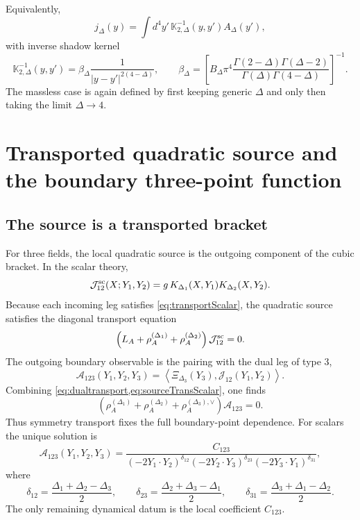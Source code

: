 \documentclass[11pt]{article}
\newcommand{\Dims}[1]{\Delta_{#1}}
\newcommand{\Ypt}[1]{Y_{#1}}
\begin{document}
Equivalently,
\begin{equation}
j_\Delta(y)
=
\int d^4y'\,\mathbb{K}_{2,\Delta}^{-1}(y,y')A_\Delta(y'),
\label{eq:amputpos}
\end{equation}
with inverse shadow kernel
\begin{equation}
\mathbb{K}_{2,\Delta}^{-1}(y,y')
=
\beta_\Delta\frac{1}{|y-y'|^{2(4-\Delta)}},
\qquad
\beta_\Delta
=
\left[
B_\Delta \pi^4
\frac{\Gamma(2-\Delta)\Gamma(\Delta-2)}
{\Gamma(\Delta)\Gamma(4-\Delta)}
\right]^{-1}.
\label{eq:shadowinv}
\end{equation}
The massless case is again defined by first keeping generic $\Delta$ and only then taking the limit $\Delta\to 4$.

\section{Transported quadratic source and the boundary three-point function}

\subsection{The source is a transported bracket}

For three fields, the local quadratic source is the outgoing component of the cubic bracket. In the scalar theory,
\begin{equation}
\mathcal{J}^{\rm sc}_{12}(X;Y_1,Y_2)
=
g\,K_{\Dims1}(X,Y_1)K_{\Dims2}(X,Y_2).
\label{eq:sourceScalar}
\end{equation}
Because each incoming leg satisfies \cref{eq:transportScalar}, the quadratic source satisfies the diagonal transport equation
\begin{equation}
\left(
L_A+\rho_A^{(\Dims1)}+\rho_A^{(\Dims2)}
\right)\mathcal{J}^{\rm sc}_{12}=0.
\label{eq:sourceTransScalar}
\end{equation}
The outgoing boundary observable is the pairing with the dual leg of type $3$,
\begin{equation}
\mathcal{A}_{123}(Y_1,Y_2,Y_3)
=
\left\langle
\Xi_{\Dims3}(Y_3),\mathcal{J}_{12}(Y_1,Y_2)
\right\rangle.
\label{eq:A123def}
\end{equation}
Combining \cref{eq:dualtransport,eq:sourceTransScalar}, one finds
\begin{equation}
\left(
\rho_A^{(\Dims1)}+\rho_A^{(\Dims2)}+\rho_A^{(\Dims3),\vee}
\right)\mathcal{A}_{123}=0.
\label{eq:A123inv}
\end{equation}
Thus symmetry transport fixes the full boundary-point dependence. For scalars the unique solution is
\begin{equation}
\mathcal{A}_{123}(\Ypt1,\Ypt2,\Ypt3)
=
\frac{C_{123}}
{(-2\Ypt1\!\cdot\!\Ypt2)^{\delta_{12}}
 (-2\Ypt2\!\cdot\!\Ypt3)^{\delta_{23}}
 (-2\Ypt3\!\cdot\!\Ypt1)^{\delta_{31}}},
\label{eq:3pt}
\end{equation}
where
\begin{equation}
\delta_{12}=\frac{\Dims1+\Dims2-\Dims3}{2},
\qquad
\delta_{23}=\frac{\Dims2+\Dims3-\Dims1}{2},
\qquad
\delta_{31}=\frac{\Dims3+\Dims1-\Dims2}{2}.
\label{eq:deltas}
\end{equation}
The only remaining dynamical datum is the local coefficient $C_{123}$.
\end{document}
